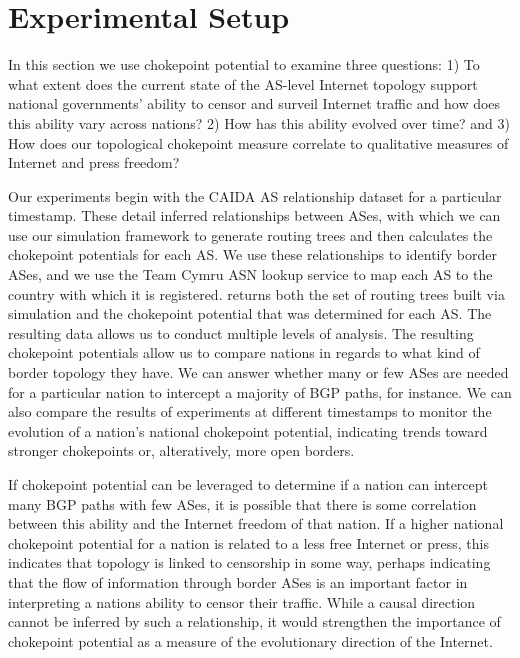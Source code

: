 \section{Experimental Setup}
\label{sec:exp}


In this section we use chokepoint potential to examine three questions: 1) To
what extent does the current state of the AS-level Internet topology support
national governments' ability to censor and surveil Internet traffic and how does
this ability vary across nations? 2) How has this ability
evolved over time? and 3) How does our topological chokepoint measure correlate to
qualitative measures of Internet and press freedom?

Our experiments begin with the CAIDA AS relationship dataset for a particular timestamp.
These detail inferred relationships between ASes, with which we can use our simulation framework
to generate routing trees and then calculates the chokepoint potentials for each AS. We use these 
relationships to identify border ASes, and we use the Team Cymru ASN lookup service to map each AS to the 
country with which it is registered. \toolname{} returns both the set of routing trees built via simulation
and the chokepoint potential that was determined for each AS. The resulting data allows us to conduct
multiple levels of analysis. The resulting chokepoint potentials allow us to compare nations in regards
to what kind of border topology they have. We can answer whether many or few ASes are needed for a 
particular nation to intercept a majority of BGP paths, for instance. We can also compare the results
of experiments at different timestamps to monitor the evolution of a nation's national chokepoint potential,
indicating trends toward stronger chokepoints or, alteratively, more open borders.

If chokepoint potential can be leveraged to determine if a nation can
intercept many BGP paths with few ASes, it is possible that there is some correlation between
this ability and the Internet freedom of that nation. If a higher national chokepoint potential
for a nation is related to a less free Internet or press, this indicates that topology is linked
to censorship in some way, perhaps indicating that the flow of information through border ASes
is an important factor in interpreting a nations ability to censor their traffic. While a causal
direction cannot be inferred by such a relationship, it would strengthen the importance of chokepoint
potential as a measure of the evolutionary direction of the Internet.

